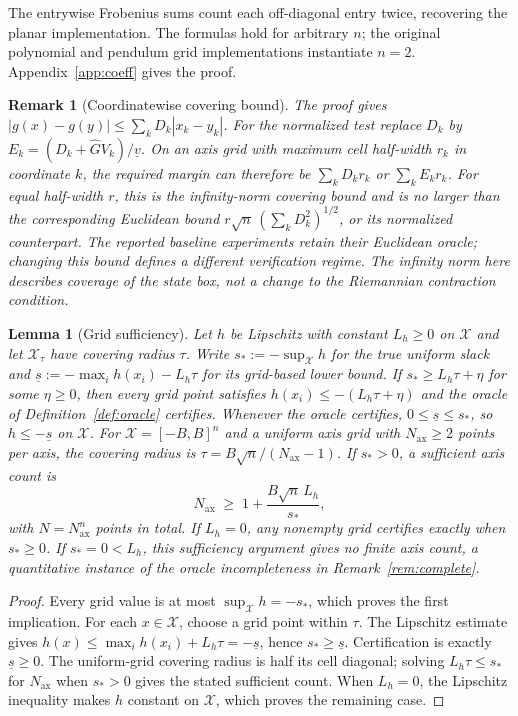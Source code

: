 \documentclass[12pt,onecolumn,journal]{IEEEtran}
\newtheorem{lemma}{Lemma}
\newtheorem{remark}{Remark}
\newcommand{\X}{\mathcal{X}}
\begin{document}
The entrywise Frobenius sums count each off-diagonal entry twice, recovering the planar implementation. The formulas hold for arbitrary $n$; the original polynomial and pendulum grid implementations instantiate $n=2$. Appendix~\ref{app:coeff} gives the proof.

\begin{remark}[Coordinatewise covering bound]
\label{rem:coordinate}
The proof gives $|g(x)-g(y)|\le\sum_kD_k|x_k-y_k|$. For the normalized test replace $D_k$ by $E_k=(D_k+\widehat G V_k)/\underline v$. On an axis grid with maximum cell half-width $r_k$ in coordinate $k$, the required margin can therefore be $\sum_kD_kr_k$ or $\sum_kE_kr_k$. For equal half-width $r$, this is the infinity-norm covering bound and is no larger than the corresponding Euclidean bound $r\sqrt n\,(\sum_kD_k^2)^{1/2}$, or its normalized counterpart. The reported baseline experiments retain their Euclidean oracle; changing this bound defines a different verification regime. The infinity norm here describes coverage of the state box, not a change to the Riemannian contraction condition.
\end{remark}

\begin{lemma}[Grid sufficiency]
\label{lem:gridsuff}
Let $h$ be Lipschitz with constant $L_h \ge 0$ on $\X$ and let $\X_\tau$ have covering radius $\tau$. Write $s_* := -\sup_\X h$ for the true uniform slack and $\underline s := -\max_i h(x_i)-L_h\tau$ for its grid-based lower bound. If $s_* \ge L_h\tau+\eta$ for some $\eta\ge0$, then every grid point satisfies $h(x_i)\le-(L_h\tau+\eta)$ and the oracle of Definition~\ref{def:oracle} certifies. Whenever the oracle certifies, $0\le\underline s\le s_*$, so $h\le-\underline s$ on $\X$. For $\X=[-B,B]^n$ and a uniform axis grid with $N_{\mathrm{ax}}\ge2$ points per axis, the covering radius is $\tau=B\sqrt n/(N_{\mathrm{ax}}-1)$. If $s_*>0$, a sufficient axis count is
\[
N_{\mathrm{ax}} \;\ge\; 1 + \frac{B\sqrt{n}\, L_h}{s_*},
\]
with $N=N_{\mathrm{ax}}^n$ points in total. If $L_h=0$, any nonempty grid certifies exactly when $s_*\ge0$. If $s_*=0<L_h$, this sufficiency argument gives no finite axis count, a quantitative instance of the oracle incompleteness in Remark~\ref{rem:complete}.
\end{lemma}

\begin{proof}
Every grid value is at most $\sup_\X h=-s_*$, which proves the first implication. For each $x\in\X$, choose a grid point within $\tau$. The Lipschitz estimate gives $h(x)\le\max_i h(x_i)+L_h\tau=-\underline s$, hence $s_*\ge\underline s$. Certification is exactly $\underline s\ge0$. The uniform-grid covering radius is half its cell diagonal; solving $L_h\tau\le s_*$ for $N_{\mathrm{ax}}$ when $s_*>0$ gives the stated sufficient count. When $L_h=0$, the Lipschitz inequality makes $h$ constant on $\X$, which proves the remaining case.
\end{proof}
\end{document}
